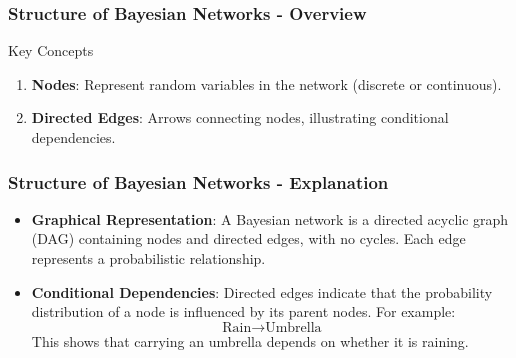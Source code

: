 \documentclass[aspectratio=169]{beamer}
\begin{document}
\begin{frame}[fragile]
    \frametitle{Structure of Bayesian Networks - Overview}
    \begin{block}{Key Concepts}
        \begin{enumerate}
            \item \textbf{Nodes}: Represent random variables in the network (discrete or continuous).
            \item \textbf{Directed Edges}: Arrows connecting nodes, illustrating conditional dependencies.
        \end{enumerate}
    \end{block}
\end{frame}

\begin{frame}[fragile]
    \frametitle{Structure of Bayesian Networks - Explanation}
    \begin{itemize}
        \item \textbf{Graphical Representation}: 
            A Bayesian network is a directed acyclic graph (DAG) containing nodes and directed edges, with no cycles. Each edge represents a probabilistic relationship.
        \item \textbf{Conditional Dependencies}: 
            Directed edges indicate that the probability distribution of a node is influenced by its parent nodes. For example:
            \begin{equation}
                \text{Rain} \rightarrow \text{Umbrella}
            \end{equation}
            This shows that carrying an umbrella depends on whether it is raining.
    \end{itemize}
\end{frame}
\end{document}
